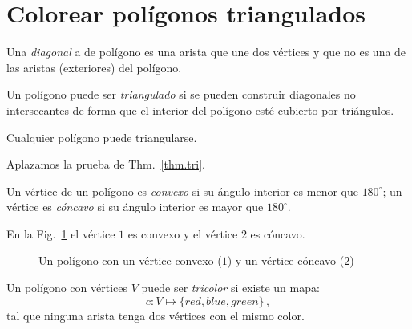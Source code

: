 \section{Colorear polígonos triangulados}\label{s.museum-triangulating}

\begin{definition}
Una \emph{diagonal} a de polígono es una arista que une dos vértices y que no es una de las aristas (exteriores) del polígono.
\end{definition}

\begin{definition}
Un polígono puede ser \emph{triangulado} si se pueden construir diagonales no intersecantes de forma que el interior del polígono esté cubierto por triángulos.
\end{definition}

\begin{theorem}
Cualquier polígono puede triangularse.\label{thm.tri}
\end{theorem}
Aplazamos la prueba de Thm.~\ref{thm.tri}.
\begin{definition}
Un vértice de un polígono es \emph{convexo} si su ángulo interior es menor que $180^\circ$; un vértice es \emph{cóncavo} si su ángulo interior es mayor que $180^\circ$. 
\end{definition}
En la Fig.~\ref{f.museum.arbitrary} el vértice $1$ es convexo y el vértice $2$ es cóncavo.

\begin{figure}[ht]
\begin{center}
\end{center}
\caption{Un polígono con un vértice convexo ($1$) y un vértice cóncavo ($2$)}\label{f.museum.arbitrary}
\end{figure}

\begin{definition}
Un polígono con vértices $V$ puede ser \emph{tricolor} si existe un mapa:
\[c: V \mapsto \{\mathit{red},\mathit{blue},\mathit{green}\}\,,\]
tal que ninguna arista tenga dos vértices con el mismo color.
\end{definition}

